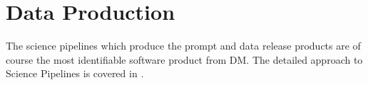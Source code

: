 \section{Data Production} \label{sec:dataproduction}
The science pipelines which produce the prompt and data release products are of course the most identifiable
software product from DM.
The detailed approach to Science Pipelines is covered in \citet{PSTN-019}.


